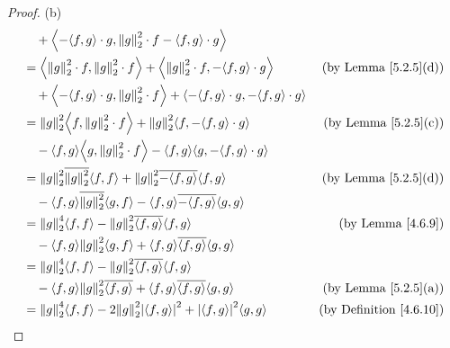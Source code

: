 \begin{proof}{(b)}
\begin{align*}
         & \quad + \inner*{-\inner*{f, g} \cdot g, \norm*{g}_2^2 \cdot f - \inner*{f, g} \cdot g}                                                                                     \\
         & = \inner*{\norm*{g}_2^2 \cdot f, \norm*{g}_2^2 \cdot f} + \inner*{\norm*{g}_2^2 \cdot f, -\inner*{f, g} \cdot g}         & \text{(by Lemma \ref{5.2.5}(d))}                \\
         & \quad + \inner*{-\inner*{f, g} \cdot g, \norm*{g}_2^2 \cdot f} + \inner*{-\inner*{f, g} \cdot g, -\inner*{f, g} \cdot g}                                                   \\
         & = \norm*{g}_2^2 \inner*{f, \norm*{g}_2^2 \cdot f} + \norm*{g}_2^2 \inner*{f, -\inner*{f, g} \cdot g}                     & \text{(by Lemma \ref{5.2.5}(c))}                \\
         & \quad - \inner*{f, g} \inner*{g, \norm*{g}_2^2 \cdot f} - \inner*{f, g} \inner*{g, -\inner*{f, g} \cdot g}                                                                 \\
         & = \norm*{g}_2^2 \overline{\norm*{g}_2^2} \inner*{f, f} + \norm*{g}_2^2 \overline{-\inner*{f, g}} \inner*{f, g}           & \text{(by Lemma \ref{5.2.5}(d))}                \\
         & \quad - \inner*{f, g} \overline{\norm*{g}_2^2} \inner*{g, f} - \inner*{f, g} \overline{-\inner*{f, g}} \inner*{g, g}                                                       \\
         & = \norm*{g}_2^4 \inner*{f, f} - \norm*{g}_2^2 \overline{\inner*{f, g}} \inner*{f, g}                                     & \text{(by Lemma \ref{4.6.9})}                   \\
         & \quad - \inner*{f, g} \norm*{g}_2^2 \inner*{g, f} + \inner*{f, g} \overline{\inner*{f, g}} \inner*{g, g}                                                                   \\
         & = \norm*{g}_2^4 \inner*{f, f} - \norm*{g}_2^2 \overline{\inner*{f, g}} \inner*{f, g}                                                                                       \\
         & \quad - \inner*{f, g} \norm*{g}_2^2 \overline{\inner*{f, g}} + \inner*{f, g} \overline{\inner*{f, g}} \inner*{g, g}      & \text{(by Lemma \ref{5.2.5}(a))}                \\
         & = \norm*{g}_2^4 \inner*{f, f} - 2 \norm*{g}_2^2 \abs{\inner*{f, g}}^2 + \abs{\inner*{f, g}}^2 \inner*{g, g}              & \text{(by Definition \ref{4.6.10})}             \\

\end{align*}
\end{proof}

